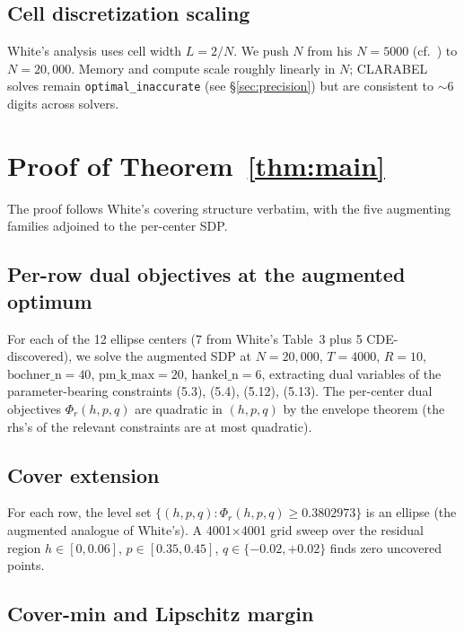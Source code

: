 \documentclass[11pt]{article}
\theoremstyle{plain}
\theoremstyle{definition}
\begin{document}
\subsection{Cell discretization scaling}\label{sec:scaling}

White's analysis uses cell width $L = 2/N$. We push $N$ from his
$N = 5000$ (cf.\ \cite[\S5]{White2023}) to $N = 20{,}000$. Memory and
compute scale roughly linearly in $N$; CLARABEL solves remain
\texttt{optimal\_inaccurate} (see \S\ref{sec:precision}) but are
consistent to $\sim 6$ digits across solvers.

\section{Proof of Theorem~\ref{thm:main}}\label{sec:proof}

The proof follows White's covering structure verbatim, with the five
augmenting families adjoined to the per-center SDP.

\subsection{Per-row dual objectives at the augmented optimum}

For each of the 12 ellipse centers (7 from White's Table~3 plus 5
CDE-discovered), we solve the augmented SDP at $N = 20{,}000$,
$T = 4000$, $R = 10$, $\text{bochner\_n} = 40$, $\text{pm\_k\_max} = 20$,
$\text{hankel\_n} = 6$, extracting dual variables of the
parameter-bearing constraints (5.3), (5.4), (5.12), (5.13). The
per-center dual objectives $\Phi_r(h, p, q)$ are quadratic in
$(h, p, q)$ by the envelope theorem (the rhs's of the relevant
constraints are at most quadratic).

\subsection{Cover extension}

For each row, the level set
$\{(h, p, q) : \Phi_r(h, p, q) \ge 0.3802973\}$ is an ellipse (the
augmented analogue of White's). A 4001$\times$4001 grid sweep over the
residual region $h \in [0, 0.06]$, $p \in [0.35, 0.45]$,
$q \in \{-0.02, +0.02\}$ finds zero uncovered points.

\subsection{Cover-min and Lipschitz margin}
\end{document}
